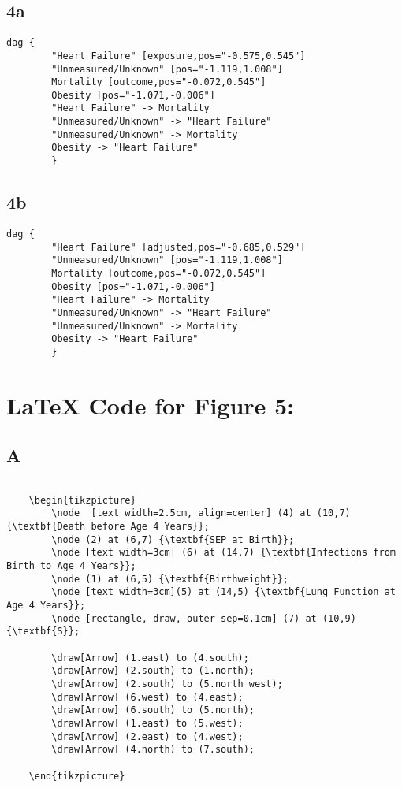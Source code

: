 \documentclass{article}
\begin{document}
\subsection*{4a}
\begin{lstlisting}[frame=single, basicstyle=\ttfamily]
    dag {
        "Heart Failure" [exposure,pos="-0.575,0.545"]
        "Unmeasured/Unknown" [pos="-1.119,1.008"]
        Mortality [outcome,pos="-0.072,0.545"]
        Obesity [pos="-1.071,-0.006"]
        "Heart Failure" -> Mortality
        "Unmeasured/Unknown" -> "Heart Failure"
        "Unmeasured/Unknown" -> Mortality
        Obesity -> "Heart Failure"
        }
\end{lstlisting}


\subsection*{4b}
\begin{lstlisting}[frame=single, basicstyle=\ttfamily]
    dag {
        "Heart Failure" [adjusted,pos="-0.685,0.529"]
        "Unmeasured/Unknown" [pos="-1.119,1.008"]
        Mortality [outcome,pos="-0.072,0.545"]
        Obesity [pos="-1.071,-0.006"]
        "Heart Failure" -> Mortality
        "Unmeasured/Unknown" -> "Heart Failure"
        "Unmeasured/Unknown" -> Mortality
        Obesity -> "Heart Failure"
        }
\end{lstlisting}

\section*{\LaTeX\hspace*{1mm} Code for Figure 5:}
\subsection*{A}
\begin{lstlisting}[frame=single, basicstyle=\ttfamily, linewidth=22.5cm]
    
    \begin{tikzpicture}
        \node  [text width=2.5cm, align=center] (4) at (10,7)  {\textbf{Death before Age 4 Years}};
        \node (2) at (6,7) {\textbf{SEP at Birth}};
        \node [text width=3cm] (6) at (14,7) {\textbf{Infections from Birth to Age 4 Years}};
        \node (1) at (6,5) {\textbf{Birthweight}};
        \node [text width=3cm](5) at (14,5) {\textbf{Lung Function at Age 4 Years}};
        \node [rectangle, draw, outer sep=0.1cm] (7) at (10,9) {\textbf{S}};
    
        \draw[Arrow] (1.east) to (4.south);
        \draw[Arrow] (2.south) to (1.north);
        \draw[Arrow] (2.south) to (5.north west);
        \draw[Arrow] (6.west) to (4.east);
        \draw[Arrow] (6.south) to (5.north);
        \draw[Arrow] (1.east) to (5.west);
        \draw[Arrow] (2.east) to (4.west);
        \draw[Arrow] (4.north) to (7.south);
        
    \end{tikzpicture}
\end{lstlisting}
\end{document}
